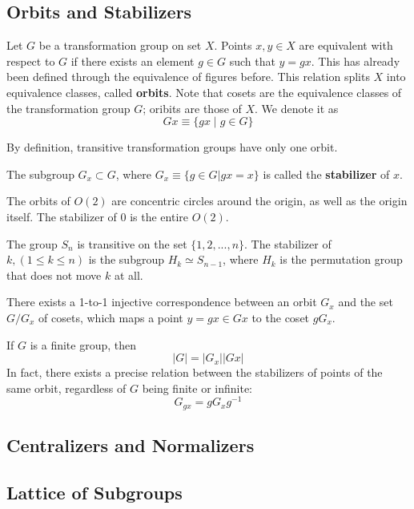 \subsection{Orbits and Stabilizers}

  \begin{definition}[Orbits]
    Let $G$ be a transformation group on set $X$. Points $x, y \in X$ are equivalent with respect to $G$ if there exists an element $g \in G$ such that $y = g x$. This has already been defined through the equivalence of figures before. This relation splits $X$ into equivalence classes, called \textbf{orbits}. Note that cosets are the equivalence classes of the transformation group $G$; oribits are those of $X$. We denote it as
    \begin{equation}
      Gx \equiv \{ g x \;|\;g \in G \}
    \end{equation}
  \end{definition}

  By definition, transitive transformation groups have only one orbit.

  \begin{definition}
    The subgroup $G_{x} \subset G$, where $G_{x} \equiv \{ g \in G | g x = x\}$ is called the \textbf{stabilizer} of $x$.
  \end{definition}

  \begin{example}
    The orbits of $O(2)$ are concentric circles around the origin, as well as the origin itself. The stabilizer of $0$ is the entire $O(2)$.
  \end{example}

  \begin{example}
    The group $S_n$ is transitive on the set $\{1, 2, ..., n\}$. The stabilizer of $k, (1 \leq k \leq n)$ is the subgroup $H_{k} \simeq S_{n-1}$, where $H_k$ is the permutation group that does not move $k$ at all. 
  \end{example}

  \begin{theorem}
    There exists a 1-to-1 injective correspondence between an orbit $G_x$ and the set $G / G_{x}$ of cosets, which maps a point $y = g x \in G x $ to the coset $g G_x$. 
  \end{theorem}

  \begin{corollary}
    If $G$ is a finite group, then 
    \begin{equation}
      |G| = |G_x| |G x|
    \end{equation}
    In fact, there exists a precise relation between the stabilizers of points of the same orbit, regardless of $G$ being finite or infinite: 
    \begin{equation}
      G_{g x} = g G_{x} g^{-1}
    \end{equation}
  \end{corollary}

\subsection{Centralizers and Normalizers} 

\subsection{Lattice of Subgroups} 


